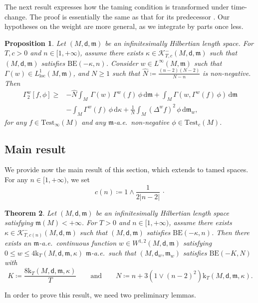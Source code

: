 \documentclass[10pt]{article}
\newcommand{\K}{\mathscr{K}}
\newcommand{\m}{\mathfrak{m}}
\newcommand{\M}{{\mathit{M}}}
\renewcommand{\d}{\,\mathrm{d}}
\newcommand{\Test}{\mathrm{Test}}
\newcommand{\loc}{{\mathrm{loc}}}
\renewcommand{\k}{\mathrm{k}}
\newcommand{\dist}{\mathsf{d}}
\newcommand{\df}{\coloneqq}
\newcommand{\BE}{{\mathrm{BE}}}
\theoremstyle{plain}
\newtheorem{theorem}{Theorem}[section]
\newtheorem{proposition}[theorem]{Proposition}
\theoremstyle{definition}
\newcommand{\Sob}{W^{1,2}(M,\dist,\m)}
\begin{document}
The next result expresses how the taming condition is transformed under time-change. The proof is essentially the same as that for its predecessor \cite[Thm.~4]{hansturm}. Our hypotheses on the weight are more general, as we integrate by parts once less.




\begin{proposition}\label{thm:timechange} Let $(M,\dist,\m)$ be an infinitesimally Hilbertian length space. For $T,c>0$ and $n \in [1,+\infty)$, assume there exists $\kappa \in \K^-_{T,c}(\M,\dist,\m)$ such that $(M,\dist,\m)$ satisfies $\BE(-\kappa,n)$. Consider $w\in L^\infty(\M,\m)$ such that $\Gamma(w)\in L^1_\loc(\M,\m)$, and $N \ge 1$ such that  $\hat{N} \df \frac{(n-2)(N-2)}{N-n}$ is non-negative.
Then
\begin{align*}
    \Gamma_2^w[f,\phi]  \geq & - \hat{N}\int_\M \,\Gamma(w)\,\Gamma^w(f)\,\phi\d\m + \int_\M\Gamma(w,\Gamma^w(f)\,\phi)\d\m \\
    &   - \int_\M\Gamma^w(f)\,\phi\d \kappa + \frac{1}{N}\int_\M(\Delta^wf)^2\,\phi\d\m_w,
\end{align*}
for any $f\in\Test_\infty(\M)$ and any $\m$-a.e.~non-negative $\phi\in\Test_c(\M)$.
\end{proposition}


\subsection{Main result}
We provide now the main result of this section, which extends \cite[Theorem 1.1]{CMT_KatoBE} to tamed spaces. For any $n \in [1,+\infty)$, we set $$c(n)\df 1\wedge \frac{1}{2|n-2|}\, \cdot $$

\begin{theorem}\label{thm:BE}Let $(M,\dist,\m)$ be an infinitesimally Hilbertian length space satisfying $\m(M)<+\infty$. For $T>0$ and $n \in [1,+\infty)$, assume there exists $\kappa \in \K^-_{T,c(n)}(M,\dist,\m)$ such that $(M,\dist,\m)$ satisfies $\mathrm{BE}(-\kappa,n)$. Then there exists an $\m$-a.e.~continuous function $w\in \Sob$ satisfying $0\leq w\leq 4\k_T(\M,\dist,\m,\kappa)$ $\m$-a.e.~such that $(\M,\dist_w,\m_w)$ satisfies $\mathrm{BE}(-K,N)$ with
\[
K \df \frac{8\k_T(\M,\dist,\m,\kappa)}{T} \qquad \text{and} \qquad N \df n+3(1\vee (n-2)^2)\k_T(\M,\dist,\m,\kappa).
\]
\end{theorem}

In order to prove this result, we need two preliminary lemmas. 
\end{document}
